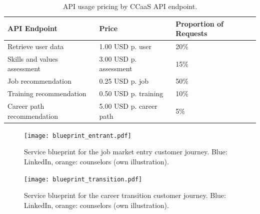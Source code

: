 \begin{table}[h!]
    \centering
    \caption{API usage pricing by CCaaS API endpoint.}
    \label{tab:pricing}

    \tiny
    \renewcommand{\arraystretch}{1.1}
    \small\setlength\tabcolsep{8pt}

    \begin{tabularx}{0.8\linewidth}{X X X}
        \toprule
        \textbf{API Endpoint} &
        \textbf{Price} &
            \textbf{Proportion of Requests} \\
        \toprule

        Retrieve user data &
            1.00 USD p. user &
            20\% \\ 
        \midrule
        
        Skills and values assessment &
            3.00 USD p. assessment &
            15\% \\ 
        \midrule

        Job recommendation &
            0.25 USD p. job &
            50\% \\ 
        \midrule

        Training recommendation &
            0.50 USD p. training &
            10\% \\
        \midrule

        Career path recommendation &
            5.00 USD p. career path &
            5\% \\ 
        \bottomrule
    \end{tabularx}
\end{table}

\begin{landscape}
    \begin{figure}[h!]
        \centering
        \caption{Service blueprint for the job market entry customer journey. Blue: LinkedIn, orange: counselors (own illustration).}
        \label{fig:blueprint_entrant}
        \texttt{[image: blueprint\_entrant.pdf]}
    \end{figure}
    
    \newpage

    \begin{figure}[h!]
        \centering
        \caption{Service blueprint for the career transition customer journey. Blue: LinkedIn, orange: counselors (own illustration).}
        \label{fig:blueprint_transition}
        \texttt{[image: blueprint\_transition.pdf]}
    \end{figure}
\end{landscape}


